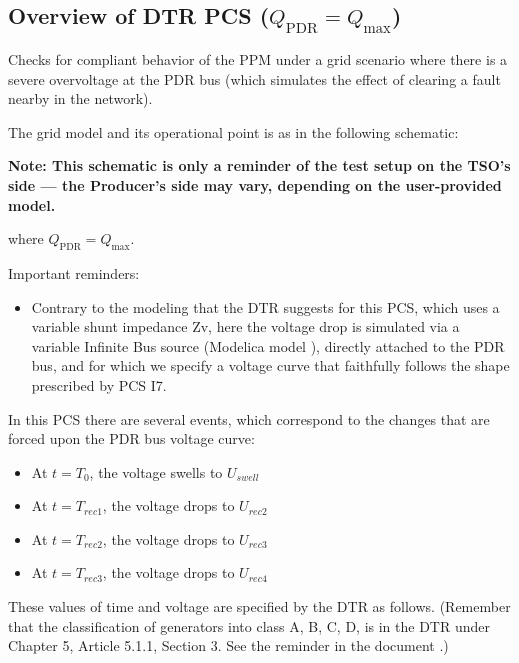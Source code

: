     \subsection{Overview of DTR PCS \DTRPcs{} ($Q_\text{PDR} = Q_\text{max}$)}

    Checks for compliant behavior of the PPM under a grid scenario where
    there is a severe overvoltage at the PDR bus (which simulates the
    effect of clearing a fault nearby in the network).

    The grid model and its operational point is as in the following schematic:
    \begin{center}
        
    \end{center}
    \begin{center}
        \small \textbf{Note: This schematic is only a reminder of the test setup on the TSO's
        side --- the Producer's side may vary, depending on the user-provided model.}
    \end{center}
    where $Q_\text{PDR} = Q_\text{max}$.

    \noindent Important reminders:
    \begin{itemize}
        \item Contrary to the modeling that the DTR suggests for this PCS, which uses a
        variable shunt impedance Zv, here the voltage drop is simulated via a variable
        Infinite Bus source (Modelica model ), directly
        attached to the PDR bus, and for which we specify a voltage curve that
        faithfully follows the shape prescribed by PCS I7.
    \end{itemize}

    In this PCS there are several events, which correspond to the changes that are
    forced upon the PDR bus voltage curve:
    \begin{itemize}
        \item At $t = T_{0}$, the voltage swells to $U_{swell}$
        \item At $t = T_{rec1}$, the voltage drops to $U_{rec2}$
        \item At $t = T_{rec2}$, the voltage drops to $U_{rec3}$
        \item At $t = T_{rec3}$, the voltage drops to $U_{rec4}$
    \end{itemize}
    These values of time and voltage are specified by the DTR as follows. (Remember
    that the classification of generators into class A, B, C, D, is in the DTR under
    Chapter 5, Article 5.1.1, Section 3. See the reminder in the document
    .)

